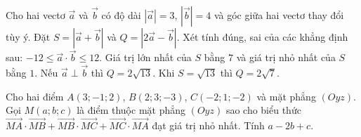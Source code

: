 \begin{ex}%
	Cho hai vectơ $\overrightarrow{a}$ và $\overrightarrow{b}$ có độ dài $|\overrightarrow{a}|=3$, $|\overrightarrow{b}|=4$ và góc giữa hai vectơ thay đổi tùy ý. Đặt $S=|\overrightarrow{a}+\overrightarrow{b}|$ và $Q=|2\overrightarrow{a}-\overrightarrow{b}|$. Xét tính đúng, sai của các khẳng định sau:
	\choiceTF
	{\True $-12\le\overrightarrow{a}\cdot\overrightarrow{b}\le 12$.}
	{\True Giá trị lớn nhất của $S$ bằng $7$ và giá trị nhỏ nhất của $S$ bằng $1$.}
	{\True Nếu $\overrightarrow{a}\perp\overrightarrow{b}$ thì $Q=2\sqrt{13}$.}
	{Khi $S=\sqrt{13}$ thì $Q=2\sqrt{7}$.}
\end{ex}

\begin{bt}%
	Cho hai điểm $A(3; -1; 2)$, $B(2; 3; -3)$, $C(-2; 1; -2)$ và mặt phẳng $(Oyz)$. Gọi $M(a; b; c)$ là  điểm thuộc mặt phẳng $(Oyz)$ sao cho biểu thức
	$\overrightarrow{MA} \cdot \overrightarrow{MB} + \overrightarrow{MB}  \cdot \overrightarrow{MC} + \overrightarrow{MC} \cdot \overrightarrow{MA}$ đạt giá trị nhỏ nhất. Tính $a - 2b + c$.
\end{bt}
